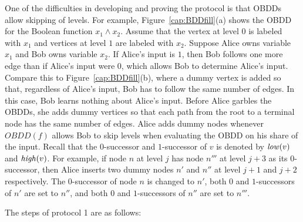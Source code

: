 One of the difficulties in developing and proving the protocol is
that OBDDs allow skipping of levels.  For example,
Figure~\ref{cap:BDDfill}(a) shows the OBDD for the Boolean function
$x_1 \wedge x_2$. Assume that the vertex at level $0$ is labeled with
$x_1$ and vertices at level $1$ are labeled with $x_2$. Suppose Alice
owns variable $x_1$ and Bob owns variable $x_2$. If Alice's input
is $1$, then Bob follows one more edge than if Alice's input were
$0$, which allows Bob to determine Alice's input. Compare this to
Figure~\ref{cap:BDDfill}(b), where a dummy vertex is added so
that, regardless of Alice's input, Bob has to follow the same number of
edges. In this case, Bob learns nothing about Alice's input. Before
Alice garbles the OBDDs, she adds dummy vertices so that each path
from the root to a terminal node has the same number of edges.  Alice adds
dummy nodes whenever $OBDD(f)$ allows Bob to skip levels when
evaluating the OBDD on his share of the input. Recall that the
$0$-successor and $1$-successor of $v$ is denoted by ${\it low}(v)$
and ${\it high}(v)$. For example, if node $n$ at level $j$ has node $n'''$ at level
$j+3$ as its $0$-successor, then Alice inserts two dummy nodes $n'$
and $n''$ at level $j+1$ and $j+2$ respectively. The $0$-successor of
node $n$ is changed to $n'$, both $0$ and $1$-successors of $n'$ are
set to $n''$, and both $0$ and $1$-successors of $n''$ are set to
$n'''$.

\vspace{2ex}
The steps of protocol 1 are as follows:

